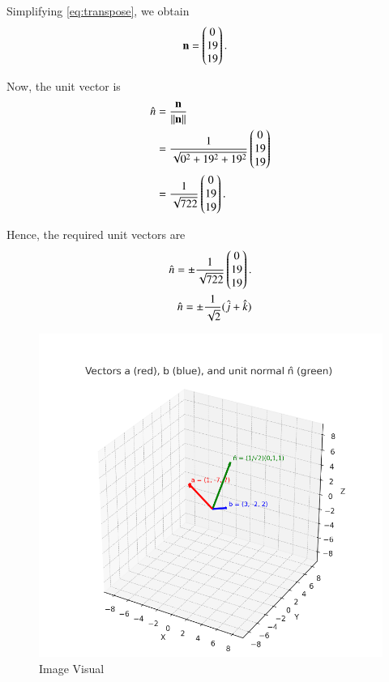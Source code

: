 \documentclass[journal]{IEEEtran}
\begin{document}
Simplifying \eqref{eq:transpose}, we obtain
\begin{align}
\mathbf{n} &= \begin{pmatrix}0 \\ 19 \\ 19\end{pmatrix}.
\end{align}

Now, the unit vector is
\begin{align}
\hat{n} &= \frac{\mathbf{n}}{\|\mathbf{n}\|} \\
&= \frac{1}{\sqrt{0^2 + 19^2 + 19^2}} \begin{pmatrix}0 \\ 19 \\ 19\end{pmatrix} \\
&= \frac{1}{\sqrt{722}} \begin{pmatrix}0 \\ 19 \\ 19\end{pmatrix}.
\end{align}

Hence, the required unit vectors are
\begin{align}
\hat{n} = \pm \frac{1}{\sqrt{722}} \begin{pmatrix}0 \\ 19 \\ 19\end{pmatrix}.\\
\hat{n} = \pm\frac{1}{\sqrt{2}}(\hat{j} + \hat{k})
\end{align}
\begin{figure}[H]
    \centering
    \includegraphics[width=0.75\columnwidth]{figs/image.png}
    \caption{Image Visual}
    \label{fig:figs/image.png}
\end{figure}
  
\end{document}
